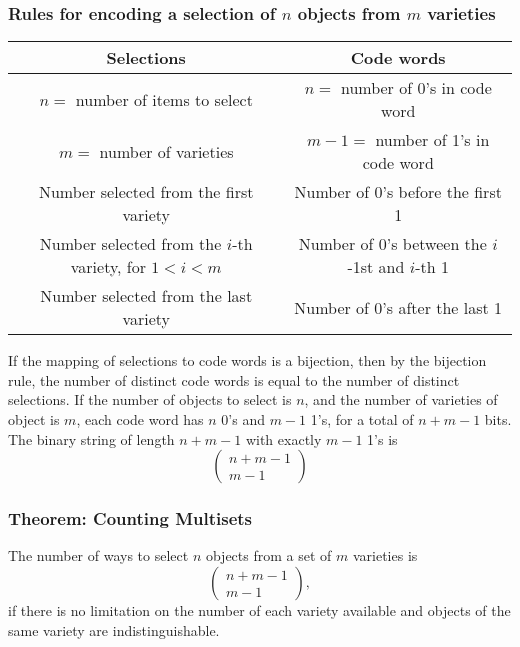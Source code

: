 \subsubsection*{Rules for encoding a selection of $n$ objects from $m$ varieties}
\begin{center}
  \begin{tabular}{|c|c|}
    \hline
    Selections                                               & Code words                                     \\
    \hline
    $n=$ number of items to select                           & $n=$ number of 0's in code word                \\
    $m=$ number of varieties                                 & $m-1=$ number of 1's in code word              \\
    Number selected from the first variety                   & Number of 0's before the first 1               \\
    Number selected from the $i$-th variety, for $1 < i < m$ & Number of 0's between the $i$-1st and $i$-th 1 \\
    Number selected from the last variety                    & Number of 0's after the last 1                 \\
    \hline
  \end{tabular}
\end{center}
If the mapping of selections to code words is a bijection, then by the bijection rule, the number of distinct code words is equal to the number of distinct selections. If the number of objects to select is $n$, and the number of varieties of object is $m$, each code word has $n$ 0's and $m-1$ 1's, for a total of $n+m-1$ bits. The binary string of length $n+m-1$ with exactly $m-1$ 1's is
\[
  \begin{pmatrix}
    n+m-1 \\ m-1
  \end{pmatrix}
\]

\subsubsection*{Theorem: Counting Multisets}
The number of ways to select $n$ objects from a set of $m$ varieties is
\[
  \begin{pmatrix}
    n+m-1 \\ m-1
  \end{pmatrix},
\]
if there is no limitation on the number of each variety available and objects of the same variety are indistinguishable.

